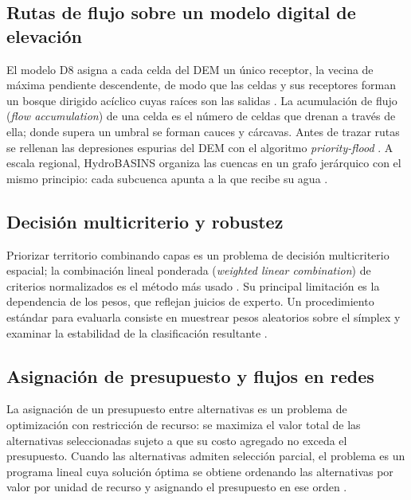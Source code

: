 \subsection{Rutas de flujo sobre un modelo digital de elevación}

El modelo D8 asigna a cada celda del DEM un único receptor, la vecina de máxima pendiente descendente, de modo que las celdas y sus receptores forman un bosque dirigido acíclico cuyas raíces son las salidas . La acumulación de flujo (\emph{flow accumulation}) de una celda es el número de celdas que drenan a través de ella; donde supera un umbral se forman cauces y cárcavas. Antes de trazar rutas se rellenan las depresiones espurias del DEM con el algoritmo \emph{priority-flood} . A escala regional, HydroBASINS organiza las cuencas en un grafo jerárquico con el mismo principio: cada subcuenca apunta a la que recibe su agua .

\subsection{Decisión multicriterio y robustez}

Priorizar territorio combinando capas es un problema de decisión multicriterio espacial; la combinación lineal ponderada (\emph{weighted linear combination}) de criterios normalizados es el método más usado . Su principal limitación es la dependencia de los pesos, que reflejan juicios de experto. Un procedimiento estándar para evaluarla consiste en muestrear pesos aleatorios sobre el símplex y examinar la estabilidad de la clasificación resultante .

\subsection{Asignación de presupuesto y flujos en redes}

La asignación de un presupuesto entre alternativas es un problema de optimización con restricción de recurso: se maximiza el valor total de las alternativas seleccionadas sujeto a que su costo agregado no exceda el presupuesto. Cuando las alternativas admiten selección parcial, el problema es un programa lineal cuya solución óptima se obtiene ordenando las alternativas por valor por unidad de recurso y asignando el presupuesto en ese orden .

